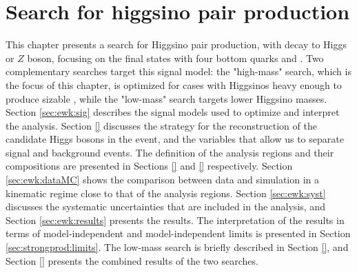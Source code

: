 \chapter{Search for higgsino pair production}
\label{chap:ewk_prod}

This chapter presents a search for Higgsino pair production, with decay to Higgs or $Z$ boson, 
focusing on the final states with four bottom quarks and \met. 
Two complementary searches target this signal model: the "high-mass" search,
which is the focus of this chapter, is optimized for 
cases with Higgsinos heavy enough to produce sizable \met, while the "low-mass" search 
targets lower Higgsino masses.
Section \ref{sec:ewk:sig} describes the signal models used to optimize and interpret the analysis. 
Section \ref{} discusses the strategy for the reconstruction of the candidate Higgs bosons in the event, 
and the variables that allow us to separate signal and background events. 
The definition of the analysis regions and their compositions are presented in Sections \ref{} and 
\ref{} respectively. 
Section \ref{sec:ewk:dataMC} shows the comparison between data and simulation in a kinematic regime close to that of the analysis regions. 
Section \ref{sec:ewk:syst} discusses the systematic uncertainties that are included in the analysis, and Section \ref{sec:ewk:results} 
presents the results. 
The interpretation of the results in terms of model-independent and model-independent limits is presented in Section \ref{sec:strongprod:limits}. 
The low-mass search is briefly described in Section \ref{}, and Section \ref{} 
presents the combined results of the two searches. 








